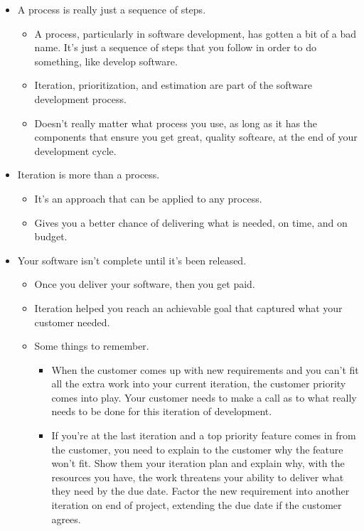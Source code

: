 \documentclass[letterpaper]{article}
\begin{document}
\begin{itemize}
    \item A process is really just a sequence of steps. 
    \begin{itemize}
        \item A process, particularly in software development, has gotten a bit of a bad name. It's just a sequence of steps that you follow in order to do something, like develop software. 
        \item Iteration, prioritization, and estimation are part of the software development process.
        \item Doesn't really matter what process you use, as long as it has the components that ensure you get great, quality softeare, at the end of your development cycle. 
    \end{itemize}

    \item Iteration is more than a process. 
    \begin{itemize}
        \item It's an approach that can be applied to any process. 
        \item Gives you a better chance of delivering what is needed, on time, and on budget. 
    \end{itemize}

    \item Your software isn't complete until it's been released. 
    \begin{itemize}
        \item Once you deliver your software, then you get paid. 
        \item Iteration helped you reach an achievable goal that captured what your customer needed. 
        \item Some things to remember.
        \begin{itemize}
            \item When the customer comes up with new requirements and you can't fit all the extra work into your current iteration, the customer priority comes into play. Your customer needs to make a call as to what really needs to be done for this iteration of development. 
            \item If you're at the last iteration and a top priority feature comes in from the customer, you need to explain to the customer why the feature won't fit. Show them your iteration plan and explain why, with the resources you have, the work threatens your ability to deliver what they need by the due date. Factor the new requirement into another iteration on end of project, extending the due date if the customer agrees.
        \end{itemize}
    \end{itemize}
\end{itemize}
\end{document}
